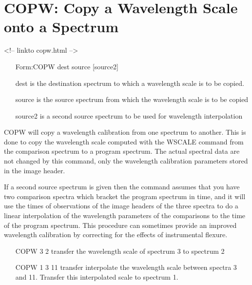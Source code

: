 \section{COPW: Copy a Wavelength Scale onto a Spectrum}
\begin{rawhtml}
<!-- linkto copw.html -->
\end{rawhtml}
\begin{itemize}
  \item[Form:COPW dest source {[source2]}\hfill]{}
  \item[dest]{is the destination spectrum to which a wavelength scale is to
       be copied.}
  \item[source]{is the source spectrum from which the wavelength scale is
       to be copied}
  \item[source2]{is a second source spectrum to be used for wavelength
       interpolation}
\end{itemize}

COPW will copy a wavelength calibration from one spectrum to another.  This
is done to copy the wavelength scale computed with the WSCALE command from
the comparison spectrum to a program spectrum.  The actual spectral data
are not changed by this command, only the wavelength calibration parameters
stored in the image header.  

If a second source spectrum is given then the command assumes that you have
two comparison spectra which bracket the program spectrum in time, and it
will use the times of observations of the image headers of the three
spectra to do a linear interpolation of the wavelength parameters of the
comparisons to the time of the program spectrum.  This procedure can
sometimes provide an improved wavelength calibration by correcting for the
effects of instrumental flexure.

\begin{itemize}
  \item[COPW 3 2\hfill]{transfer the wavelength scale of spectrum 3 to
       spectrum 2}

  \item[COPW 1 3 11\hfill]{transfer interpolate the wavelength scale
       between spectra 3 and 11.  Transfer this interpolated scale to
       spectrum 1.}
\end{itemize}

